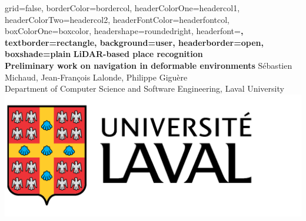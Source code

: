 \documentclass[a0paper,portrait]{baposter}
\begin{document}
\begin{poster}{
        grid=false,
        borderColor=bordercol, %
        headerColorOne=headercol1, %
        headerColorTwo=headercol2, %
        headerFontColor=headerfontcol, %
        boxColorOne=boxcolor, %
        headershape=roundedright, %
        headerfont=\Large\sf\bf, %
        textborder=rectangle,
        background=user,
        headerborder=open, %
        boxshade=plain
    }
    {}
    {\sf\bf LiDAR-based place recognition
    \\ \large Preliminary work on navigation in deformable environments} %
    {\vspace{1em} Sébastien Michaud, Jean-François Lalonde, Philippe Giguère\\ %
    {\smaller Department of Computer Science and Software Engineering, Laval University}} %
    {\includegraphics[scale=0.12]{./figures/logo.png}} %




\end{poster}
\end{document}
